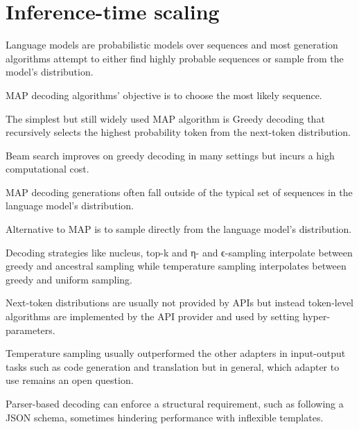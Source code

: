 \section{Inference-time scaling}

Language models are probabilistic models over sequences and most generation algorithms attempt to either find highly probable sequences or sample from the model’s distribution. \cite{welleck2024decodingmetagenerationinferencetimealgorithms}

MAP decoding algorithms' objective is to choose the most likely sequence. \cite{welleck2024decodingmetagenerationinferencetimealgorithms}

The simplest but still widely used MAP algorithm is Greedy decoding that recursively selects the highest probability token from the next-token distribution. \cite{welleck2024decodingmetagenerationinferencetimealgorithms}

Beam search improves on greedy decoding in many settings but incurs a high computational cost. \cite{welleck2024decodingmetagenerationinferencetimealgorithms}

MAP decoding generations often fall outside of the typical set of sequences in the language model’s distribution. \cite{welleck2024decodingmetagenerationinferencetimealgorithms}

Alternative to MAP is to sample directly from the language model's distribution. \cite{welleck2024decodingmetagenerationinferencetimealgorithms}

Decoding strategies like nucleus, top-k and η- and ϵ-sampling interpolate between greedy and ancestral sampling while temperature sampling interpolates between greedy and uniform sampling. \cite{welleck2024decodingmetagenerationinferencetimealgorithms}

Next-token distributions are usually not provided by APIs but instead token-level algorithms are implemented by the API provider and used by setting hyper-parameters. \cite{welleck2024decodingmetagenerationinferencetimealgorithms}

Temperature sampling usually outperformed the other adapters in input-output tasks such as code generation and translation but in general, which adapter to use remains an open question. \cite{welleck2024decodingmetagenerationinferencetimealgorithms}

Parser-based decoding can enforce a structural requirement, such as following a JSON schema, sometimes hindering performance with inflexible templates.  \cite{welleck2024decodingmetagenerationinferencetimealgorithms}

